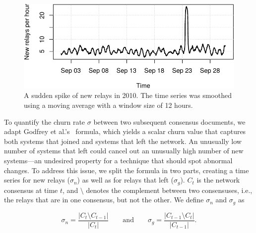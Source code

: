 \begin{figure}[t]
	\centering
	\includegraphics[width=\linewidth]{diagrams/sudden-spike.pdf}
	\caption{A sudden spike of new relays in 2010.  The time series was smoothed
	using a moving average with a window size of 12 hours.}
	\label{fig:sudden-spike}
\end{figure}

To quantify the churn rate $\sigma$ between two subsequent consensus documents,
we adapt Godfrey et al.'s~\cite{Godfrey2006a} formula, which yields a scalar
churn value that captures both systems that joined and systems that left the
network.  An unusually low number of systems that left could cancel out an
unusually high number of new systems---an undesired property for a technique
that should spot abnormal changes.  To address this issue, we split the formula
in two parts, creating a time series for new relays ($\sigma_{n}$) as well as
for relays that left ($\sigma_{g}$).  $C_{t}$ is the network consensus at time
$t$, and $\setminus$ denotes the complement between two consensuses, i.e., the
relays that are in one consensus, but not the other.  We define $\sigma_{n}$ and
$\sigma_{g}$ as


\begin{equation}
\sigma_{n} = \frac{\lvert C_{t} \setminus C_{t-1} \rvert}
{\lvert C_{t} \rvert}
\qquad\text{and}\qquad
\sigma_{g} = \frac{\lvert C_{t-1} \setminus C_{t} \rvert}
{\lvert C_{t-1} \rvert}.
\end{equation}

